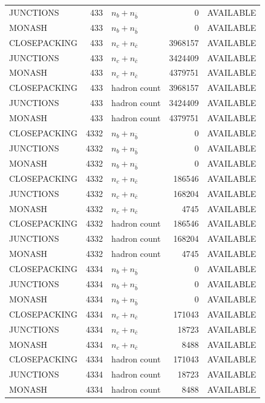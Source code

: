 \begin{landscape}
\begin{longtable}{@{}lrlrl@{}}
JUNCTIONS & 433 & $n_b+n_{\bar b}$ & \num{0} & AVAILABLE \\
MONASH & 433 & $n_b+n_{\bar b}$ & \num{0} & AVAILABLE \\
CLOSEPACKING & 433 & $n_c+n_{\bar c}$ & \num{3968157} & AVAILABLE \\
JUNCTIONS & 433 & $n_c+n_{\bar c}$ & \num{3424409} & AVAILABLE \\
MONASH & 433 & $n_c+n_{\bar c}$ & \num{4379751} & AVAILABLE \\
CLOSEPACKING & 433 & hadron count & \num{3968157} & AVAILABLE \\
JUNCTIONS & 433 & hadron count & \num{3424409} & AVAILABLE \\
MONASH & 433 & hadron count & \num{4379751} & AVAILABLE \\
CLOSEPACKING & 4332 & $n_b+n_{\bar b}$ & \num{0} & AVAILABLE \\
JUNCTIONS & 4332 & $n_b+n_{\bar b}$ & \num{0} & AVAILABLE \\
MONASH & 4332 & $n_b+n_{\bar b}$ & \num{0} & AVAILABLE \\
CLOSEPACKING & 4332 & $n_c+n_{\bar c}$ & \num{186546} & AVAILABLE \\
JUNCTIONS & 4332 & $n_c+n_{\bar c}$ & \num{168204} & AVAILABLE \\
MONASH & 4332 & $n_c+n_{\bar c}$ & \num{4745} & AVAILABLE \\
CLOSEPACKING & 4332 & hadron count & \num{186546} & AVAILABLE \\
JUNCTIONS & 4332 & hadron count & \num{168204} & AVAILABLE \\
MONASH & 4332 & hadron count & \num{4745} & AVAILABLE \\
CLOSEPACKING & 4334 & $n_b+n_{\bar b}$ & \num{0} & AVAILABLE \\
JUNCTIONS & 4334 & $n_b+n_{\bar b}$ & \num{0} & AVAILABLE \\
MONASH & 4334 & $n_b+n_{\bar b}$ & \num{0} & AVAILABLE \\
CLOSEPACKING & 4334 & $n_c+n_{\bar c}$ & \num{171043} & AVAILABLE \\
JUNCTIONS & 4334 & $n_c+n_{\bar c}$ & \num{18723} & AVAILABLE \\
MONASH & 4334 & $n_c+n_{\bar c}$ & \num{8488} & AVAILABLE \\
CLOSEPACKING & 4334 & hadron count & \num{171043} & AVAILABLE \\
JUNCTIONS & 4334 & hadron count & \num{18723} & AVAILABLE \\
MONASH & 4334 & hadron count & \num{8488} & AVAILABLE \\

\end{longtable}
\end{landscape}
